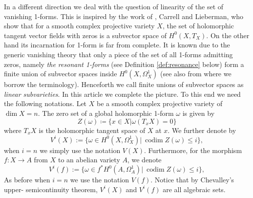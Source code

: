 \documentclass[a4paper,12pt,reqno]{amsart}
\theoremstyle{plain}
\theoremstyle{definition}
\theoremstyle{remark}
\newcommand{\C}{\mathbb C}
\newcommand{\codim}{\operatorname{codim}}
\begin{document}
In a different direction we deal with the question
of linearity of the set of vanishing 1-forms. This is
inspired by the work of  \cite{CL73}, Carrell and Lieberman, who show that for a smooth complex projective variety $X$, the set of holomorphic tangent vector fields with zeros is a subvector space of $H^0(X, T_X)$. On the
other hand its incarnation for 1-form is far from complete.
It is known due to the generic vanishing theory
that only a piece of the set of all 1-forms admitting zeros, namely \emph{the resonant 1-forms} (see Definition \ref{def:resonance} below) 
form a finite union of subvector spaces inside $H^0(X, \Omega_X^1)$ \cite[Theorem 4.2]{Sim93} (see also \cite{DiPa13} from where
we borrow the terminology). 
Henceforth we call finite unions of subvector spaces as \emph{linear subvarieties}.
In this article we complete the picture. To this end we need the 
following notations.
Let $X$ be a smooth complex projective variety of $\dim X=n$. The zero set of a global holomorphic 1-form $\omega$
is given by 
\[Z(\omega) \coloneqq \{x\in X| \omega(T_xX) = 0\}\]
where $T_xX$ is the holomorphic tangent space of $X$ at $x$. 
We further denote by 
\[V^i(X):=\{ \omega\in H^0(X, \Omega_X^1) |\ \codim Z(\omega)\leq i\},\] when $i=n$ we simply use the notation $V(X)$.
Furthermore, for the morphism $f:X\to A$ from $X$ to an abelian variety $A$, we denote
\[V^i(f):=\{ \omega\in f^*H^0(A, \Omega_A^1) |\ \codim Z(\omega)\leq i\},\]
As before when $i=n$ we use the notation $V(f)$. Notice that by Chevalley’s upper- semicontinuity theorem, $V^i(X)$ and $V^i(f)$ are all algebraic sets.

\end{document}
